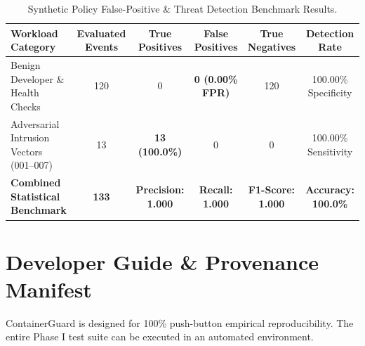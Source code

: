 \documentclass[11pt,a4paper]{article}
\begin{document}
\begin{table}[H]
\centering
\small
\begin{tabularx}{\textwidth}{l c c c c c}
\toprule
\textbf{Workload Category} & \textbf{Evaluated Events} & \textbf{True Positives} & \textbf{False Positives} & \textbf{True Negatives} & \textbf{Detection Rate} \\
\midrule
Benign Developer \& Health Checks & 120 & 0 & \textbf{0 (0.00\% FPR)} & 120 & 100.00\% Specificity \\
Adversarial Intrusion Vectors (001--007) & 13 & \textbf{13 (100.0\%)} & 0 & 0 & 100.00\% Sensitivity \\
\midrule
\textbf{Combined Statistical Benchmark} & \textbf{133} & \textbf{Precision: 1.000} & \textbf{Recall: 1.000} & \textbf{F1-Score: 1.000} & \textbf{Accuracy: 100.0\%} \\
\bottomrule
\end{tabularx}
\caption{Synthetic Policy False-Positive \& Threat Detection Benchmark Results.}
\label{tab:false_positive}
\end{table}


\section{Developer Guide \& Provenance Manifest}

ContainerGuard is designed for 100\% push-button empirical reproducibility. The entire Phase I test suite can be executed in an automated environment.
\end{document}
